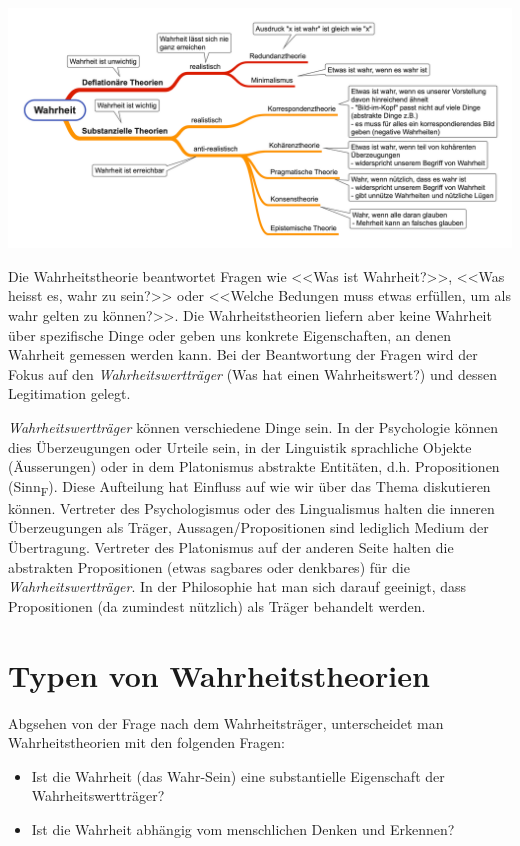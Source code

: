 \documentclass[../main.tex]{subfiles}
\begin{document}
\includegraphics[width=\textwidth]{images/Wahrheit_Uebersicht.png}

\vspace{20pt}

Die Wahrheitstheorie beantwortet Fragen wie <<Was ist Wahrheit?>>, <<Was heisst es, wahr zu sein?>> oder <<Welche Bedungen muss etwas erfüllen, um als wahr gelten zu können?>>. Die Wahrheitstheorien liefern aber keine Wahrheit über spezifische Dinge oder geben uns konkrete Eigenschaften, an denen Wahrheit gemessen werden kann. Bei der Beantwortung der Fragen wird der Fokus auf den \textit{Wahrheitswertträger} (Was hat einen Wahrheitswert?) und dessen Legitimation gelegt. 

\textit{Wahrheitswertträger} können verschiedene Dinge sein. In der Psychologie können dies Überzeugungen oder Urteile sein, in der Linguistik sprachliche Objekte (Äusserungen) oder in dem Platonismus abstrakte Entitäten, d.h. Propositionen (Sinn\textsubscript{F}). Diese Aufteilung hat Einfluss auf wie wir über das Thema diskutieren können. Vertreter des Psychologismus oder des Lingualismus halten die inneren Überzeugungen als Träger, Aussagen/Propositionen sind lediglich Medium der Übertragung. Vertreter des Platonismus auf der anderen Seite halten die abstrakten Propositionen (etwas sagbares oder denkbares) für die \textit{Wahrheitswertträger}. In der Philosophie hat man sich darauf geeinigt, dass Propositionen (da zumindest nützlich) als Träger behandelt werden. 

\vspace{10pt}

\section{Typen von Wahrheitstheorien}
Abgsehen von der Frage nach dem Wahrheitsträger, unterscheidet man Wahrheitstheorien mit den folgenden Fragen:
\begin{itemize}
	\item Ist die Wahrheit (das Wahr-Sein) eine substantielle Eigenschaft der Wahrheitswertträger?
	\item Ist die Wahrheit abhängig vom menschlichen Denken und Erkennen?
\end{itemize}
\end{document}
